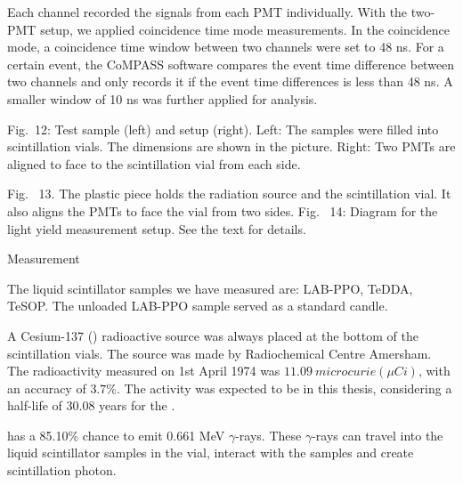 Each channel recorded the signals from each PMT individually. With the two-PMT setup, we applied coincidence time mode measurements. In the coincidence mode, a coincidence time window between two channels were set to 48 ns. For a certain event, the CoMPASS software compares the event time difference between two channels and only records it if the event time differences is less than 48 ns. A smaller window of 10 ns was further applied for analysis.


Fig.~12: Test sample (left) and setup (right). Left: The samples were filled into scintillation vials. The dimensions are shown in the picture. Right: Two PMTs are aligned to face to the scintillation vial from each side.


Fig.~ 13. The plastic piece holds the radiation source and the scintillation vial.  It also aligns the PMTs to face the vial from two sides.
Fig.~ 14:  Diagram for the light yield measurement setup. See the text for details.

Measurement

The liquid scintillator samples we have measured are: LAB-PPO, TeDDA, TeSOP. The unloaded LAB-PPO sample served as a standard candle. 


A Cesium-137 () radioactive source was always placed at the bottom of the scintillation vials.
The source was made by Radiochemical Centre Amersham. The radioactivity measured on 1st April 1974 was $11.09~microcurie(\mu Ci)$, with an accuracy of $3.7\%$. The activity was expected to be 
in this thesis, considering a half-life of 30.08 years for the \cite{nndc}.



has a 85.10\% chance to emit 0.661 MeV $\gamma$-rays\cite{nndc}. These $\gamma$-rays can travel into the liquid scintillator samples in the vial, interact with the samples and create scintillation photon.


